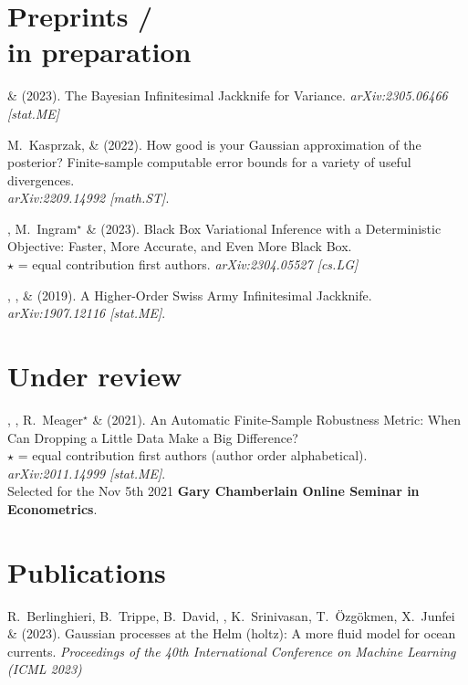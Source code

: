 \section{\sc Preprints / \\in preparation}

\me \& \tamara (2023).
The Bayesian Infinitesimal Jackknife for Variance.
\emph{arXiv:2305.06466 [stat.ME]}


M.~Kasprzak, \me \& \tamara (2022).
How good is your Gaussian approximation of the posterior? Finite-sample computable error bounds for a variety of useful divergences.\\
\emph{arXiv:2209.14992 [math.ST]}.

\mestar, M.~Ingram$^\star$ \& \tamara  (2023).
Black Box Variational Inference with a Deterministic Objective: Faster, More Accurate, 
and Even More Black Box.\\
$\star$ = equal contribution first authors.
\emph{arXiv:2304.05527 [cs.LG]}


\me, \mike, \& \tamara (2019).
A Higher-Order Swiss Army Infinitesimal Jackknife.
\emph{arXiv:1907.12116 [stat.ME]}.

\section{\sc Under review}

\tamara, \mestar, R.~Meager$^\star$ \&  (2021).
An Automatic Finite-Sample Robustness Metric: When Can Dropping a Little Data
Make a Big Difference?\\
$\star$ = equal contribution first authors (author order alphabetical).
\emph{arXiv:2011.14999 [stat.ME]}. \\
Selected for the Nov 5th 2021 \textbf{Gary Chamberlain Online Seminar in Econometrics}.


\section{\sc Publications}

R.~Berlinghieri, B.~Trippe, B.~David, \me,  K.~Srinivasan, T.~{\"O}zg{\"o}kmen, X.~Junfei 
\& \tamara (2023).
Gaussian processes at the Helm (holtz): A more fluid model for ocean currents.
\emph{Proceedings of the 40th International Conference on Machine Learning (ICML 2023)}

